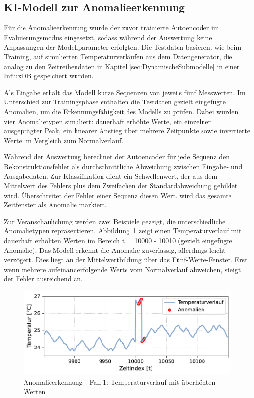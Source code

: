 \newpage
\subsection{KI-Modell zur Anomalieerkennung}

Für die Anomalieerkennung wurde der zuvor trainierte Autoencoder im Evaluierungsmodus eingesetzt, sodass während der Auswertung keine Anpassungen der Modellparameter erfolgten.
Die Testdaten basieren, wie beim Training, auf simulierten Temperaturverläufen aus dem Datengenerator, die analog zu den Zeitreihendaten in Kapitel \ref{sec:DynamischeSubmodelle} in einer InfluxDB gespeichert wurden.

Als Eingabe erhält das Modell kurze Sequenzen von jeweils fünf Messwerten.
Im Unterschied zur Trainingsphase enthalten die Testdaten gezielt eingefügte Anomalien, um die Erkennungsfähigkeit des Modells zu prüfen.
Dabei wurden vier Anomalietypen simuliert: dauerhaft erhöhte Werte, ein einzelner ausgeprägter Peak, ein linearer Anstieg über mehrere Zeitpunkte sowie invertierte Werte im Vergleich zum Normalverlauf.

Während der Auswertung berechnet der Autoencoder für jede Sequenz den Rekonstruktionsfehler als durchschnittliche Abweichung zwischen Eingabe- und Ausgabedaten. 
Zur Klassifikation dient ein Schwellenwert, der aus dem Mittelwert des Fehlers plus dem Zweifachen der Standardabweichung gebildet wird. 
Überschreitet der Fehler einer Sequenz diesen Wert, wird das gesamte Zeitfenster als Anomalie markiert.

Zur Veranschaulichung werden zwei Beispiele gezeigt, die unterschiedliche Anomalietypen repräsentieren. 
Abbildung~\ref{fig:Fall1} zeigt einen Temperaturverlauf mit dauerhaft erhöhten Werten im Bereich t = 10000 - 10010 (gezielt eingefügte Anomalie). 
Das Modell erkennt die Anomalie zuverlässig, allerdings leicht verzögert. 
Dies liegt an der Mittelwertbildung über das Fünf-Werte-Fenster.
Erst wenn mehrere aufeinanderfolgende Werte vom Normalverlauf abweichen, steigt der Fehler ausreichend an.

\vspace{-0.75em}
\begin{figure}[htbp]
    \centering
        \includegraphics[width=1\textwidth]{Bilder/Ergebnisse/KI/Fall1.pdf}
        \vspace{-2em}
    \caption[Anomalieerkennung - Fall 1]{Anomalieerkennung - Fall 1: Temperaturverlauf mit überhöhten Werten}
    \label{fig:Fall1}
\end{figure}
\vspace{-0.75em}

